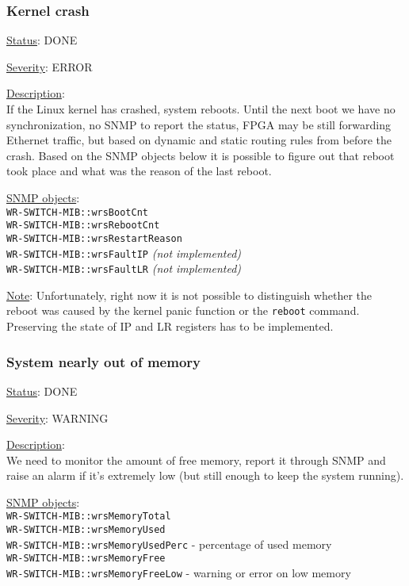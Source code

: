 \subsubsection{\bf Kernel crash}
		\begin{packed_enum}
			\item [] \underline{Status}: DONE
			\item [] \underline{Severity}: ERROR
			\item [] \underline{Description}:\\
				If the Linux kernel has crashed, system reboots. Until the next boot we
				have no synchronization, no SNMP to report the status, FPGA may be still
				forwarding Ethernet traffic, but based on dynamic and static routing
				rules from before the crash. Based on the SNMP objects below it is
				possible to figure out that reboot took place and what was the reason of
				the last reboot.
			\item [] \underline{SNMP objects}:\\
				\texttt{WR-SWITCH-MIB::wrsBootCnt}\\
				\texttt{WR-SWITCH-MIB::wrsRebootCnt}\\
				\texttt{WR-SWITCH-MIB::wrsRestartReason}\\
				\texttt{WR-SWITCH-MIB::wrsFaultIP} \emph{(not implemented)}\\
				\texttt{WR-SWITCH-MIB::wrsFaultLR} \emph{(not implemented)}
			\item [] \underline{Note}:
				Unfortunately, right now it is not possible to distinguish whether the
				reboot was caused by the kernel panic function or the \texttt{reboot}
				command. Preserving the state of IP and LR registers has to be
				implemented.
		\end{packed_enum}
\subsubsection{\bf System nearly out of memory}
		\label{fail:other:no_mem}
		\begin{packed_enum}
			\item [] \underline{Status}: DONE
			\item [] \underline{Severity}: WARNING
			\item [] \underline{Description}:\\
				We need to monitor the amount of free memory, report it through SNMP and
				raise an alarm if it's extremely low (but still enough to keep the
				system running).
			\item [] \underline{SNMP objects}:\\
				\texttt{WR-SWITCH-MIB::wrsMemoryTotal}\\
				\texttt{WR-SWITCH-MIB::wrsMemoryUsed}\\
				\texttt{WR-SWITCH-MIB::wrsMemoryUsedPerc} - percentage of used memory\\
				\texttt{WR-SWITCH-MIB::wrsMemoryFree}\\
				\texttt{WR-SWITCH-MIB::wrsMemoryFreeLow} - warning or error on low memory
		\end{packed_enum}
